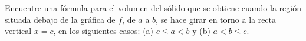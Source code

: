\item Encuentre una fórmula para el volumen del sólido que se obtiene cuando la región situada debajo de la gráfica de $f$, de $a$ a $b$, se hace girar en torno a la recta vertical $x = c$, en los siguientes casos: (a) $c \le a < b$ y (b) $a < b \le c$.
